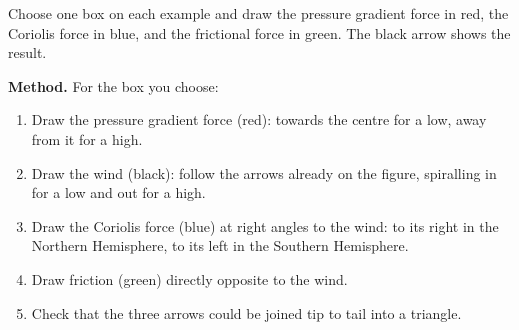 \begin{questionbox}
Choose one box on each example and draw the pressure gradient force in red, the Coriolis force in blue, and the frictional force in green. The black arrow shows the result.
\end{questionbox}

\textbf{Method.} For the box you choose:
\begin{enumerate}[label=\textbf{Step \arabic*.},leftmargin=*,itemsep=3pt]
\item Draw the pressure gradient force (red): towards the centre for a low, away from it for a high.
\item Draw the wind (black): follow the arrows already on the figure, spiralling in for a low and out for a high.
\item Draw the Coriolis force (blue) at right angles to the wind: to its right in the Northern Hemisphere, to its left in the Southern Hemisphere.
\item Draw friction (green) directly opposite to the wind.
\item Check that the three arrows could be joined tip to tail into a triangle.
\end{enumerate}

